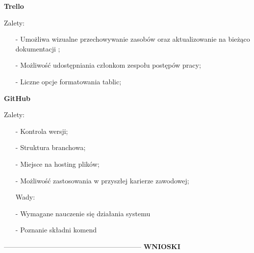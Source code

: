 \documentclass[a4paper,titleauthor]{mwart}
\begin{document}
\textbf{Trello} \newline
\indent

Zalety:
\begin{itemize}

\item[-]
Umożliwa wizualne przechowywanie zasobów oraz aktualizowanie na bieżąco dokumentacji ;

\item[-]
Możliwość udostępniania członkom zespołu postępów pracy;

\item[-]
Liczne opcje formatowania tablic;


\end{itemize}
\vspace{1cm}

\textbf{GitHub} \newline
\indent

Zalety:
\begin{itemize}
\item[-]
Kontrola wersji;
	
\item[-]
Struktura branchowa;
	
\item[-]
Miejsce na hosting plików;
	
\item[-]
Możliwość zastosowania w przyszłej karierze zawodowej;
	

Wady:
\item[-]
Wymagane nauczenie się działania systemu
	
\item[-]
Poznanie składni komend
\end{itemize}

------------------------------------------------------------\newline \newline \newline \newline
\vspace{0,5cm}
\textbf{WNIOSKI} \newline
\end{document}
